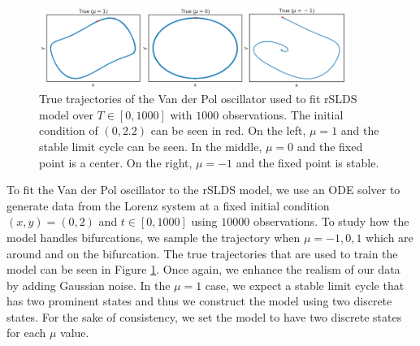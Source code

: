 \begin{figure}
    \centering
    \includegraphics[width=0.90\textwidth,height=\textwidth,keepaspectratio]{./figures/paper_fig10.png}
    \caption{True trajectories of the Van der Pol oscillator used to fit rSLDS model over $T\in[0,1000]$ with $1000$ observations. The initial condition of $(0,2.2)$ can be seen in red. On the left, $\mu =1$ and the stable limit cycle can be seen. In the middle, $\mu = 0$ and the fixed point is a center. On the right, $\mu = -1$ and the fixed point is stable.}
    \label{trueVDP}
\end{figure}

To fit the Van der Pol oscillator to the rSLDS model, we use an ODE solver to generate data from the Lorenz system at a fixed initial condition $(x,y) = (0,2)$ and $t \in [0,1000]$ using $10000$ observations. To study how the model handles bifurcations, we sample the trajectory when $\mu = -1,0,1$ which are around and on the bifurcation. The true trajectories that are used to train the model can be seen in Figure \ref{trueVDP}. Once again, we enhance the realism of our data by adding Gaussian noise. In the $\mu = 1$ case, we expect a stable limit cycle that has two prominent states and thus we construct the model using two discrete states. For the sake of consistency, we set the model to have two discrete states for each $\mu$ value. 



